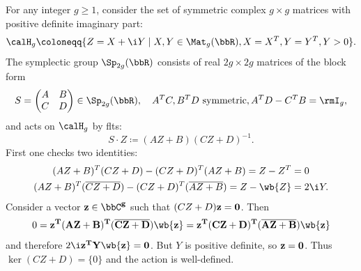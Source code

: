 \begin{example}\label{ex siegel upper half-space}
    For any integer $g\geq 1$, consider the set of symmetric complex $g\times g$ matrices with positive definite imaginary part:
    \[\calH_g \coloneqq \{Z=X+\i Y\mid X,Y\in \Mat_g(\bbR), X=X^T, Y=Y^T, Y>0\}.\]
    The symplectic group $\Sp_{2g}(\bbR)$ consists of real $2g\times 2g$ matrices of the block form 
    \[S=\begin{pmatrix}
        A & B\\
        C & D
    \end{pmatrix}\in\Sp_{2g}(\bbR),\quad A^T C,B^TD\text{ symmetric}, A^TD-C^TB=\rmI_g,\]
    and acts on $\calH_g$ by \glspl{flt}:
    \[S\cdot Z\coloneqq (AZ+B)(CZ+D)^{-1}.\]
    First one checks two identities:
    \begin{align}
        (AZ+B)^T (CZ+D)-(CZ+D)^T(AZ+B)=Z-Z^T&=0\label{1y94}\\
        (AZ+B)^T (\overline{CZ+D})-(CZ+D)^T(\overline{AZ+B})=Z-\wb{Z}&=2\i Y.\label{13702}
    \end{align}
    Consider a vector $\bf{z}\in\bbC^g$ such that $(CZ+D)\bf{z}=0$. Then 
    \[0=\bf{z}^T (AZ+B)^T(\overline{CZ+D})\wb{\bf{z}}=z^T (CZ+D)^T(\overline{AZ+B})\wb{\bf{z}}\]
    and therefore $2\i \bf{z}^T Y \wb{\bf{z}}=0$. But $Y$ is positive definite, so $\bf{z}=0$. Thus $\ker(CZ+D)=\{0\}$ and the action is well-defined.


\end{example}
